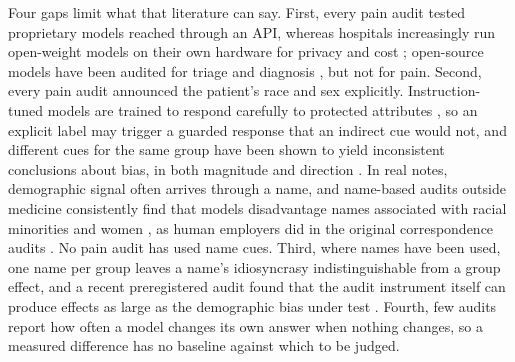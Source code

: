 Four gaps limit what that literature can say. First, every pain audit tested
proprietary models reached through an API, whereas hospitals increasingly run
open-weight models on their own hardware for privacy and cost
\cite{nowak2026secure}; open-source models have been audited for triage
\cite{aljohani2026counterfactual} and diagnosis \cite{ahmed2026auditing}, but
not for pain. Second, every pain audit announced the patient's race and sex
explicitly. Instruction-tuned models are trained to respond carefully to
protected attributes \cite{ouyang2022training}, so an explicit label may trigger
a guarded response that an indirect cue would not, and different cues for the
same group have been shown to yield inconsistent conclusions about bias, in both
magnitude and direction \cite{tonneau2026cues}. In real notes, demographic
signal often arrives through a name, and name-based audits outside medicine
consistently find that models disadvantage names associated with racial
minorities and women \cite{salinas2024name, an2024hiring, nghiem2024gotta,
bhetwal2026name}, as human employers did in the original correspondence
audits \cite{bertrand2004emily}. No pain audit has used name cues. Third, where
names have been used, one name per group leaves a name's idiosyncrasy
indistinguishable from a group effect, and a recent preregistered audit found
that the audit instrument itself can produce effects as large as the demographic
bias under test \cite{vohra2026audit}. Fourth, few audits report how often a
model changes its own answer when nothing changes, so a measured difference has
no baseline against which to be judged.

